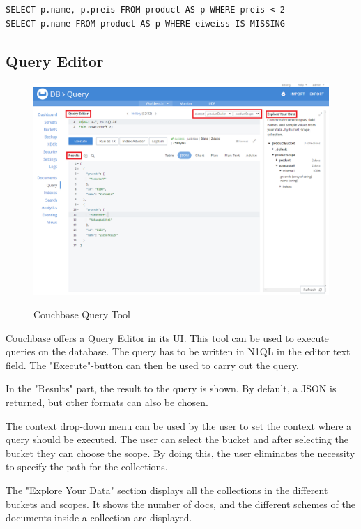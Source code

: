 \begin{lstlisting}
SELECT p.name, p.preis FROM product AS p WHERE preis < 2
SELECT p.name FROM product AS p WHERE eiweiss IS MISSING
\end{lstlisting}

\subsection{Query Editor}

\begin{figure}[H]
    \centering
    \caption{Couchbase Query Tool}
    \includegraphics[width=\textwidth]{images/Query_Tool_Couchbase_marked.png}
    \label{fig:CouchbaseQueryTool}
\end{figure}

Couchbase offers a Query Editor in its \ac{UI}. This tool can be used to execute queries on the database. The query has to be written in \ac{N1QL} in the editor text field. The "Execute"-button can then be used to carry out the query.

In the "Results" part, the result to the query is shown. By default, a \ac{JSON} is returned, but other formats can also be chosen.

The context drop-down menu can be used by the user to set the context where a query should be executed. The user can select the bucket and after selecting the bucket they can choose the scope. By doing this, the user eliminates the necessity to specify the path for the collections.

The "Explore Your Data" section displays all the collections in the different buckets and scopes. It shows the number of docs, and the different schemes of the documents inside a collection are displayed.

